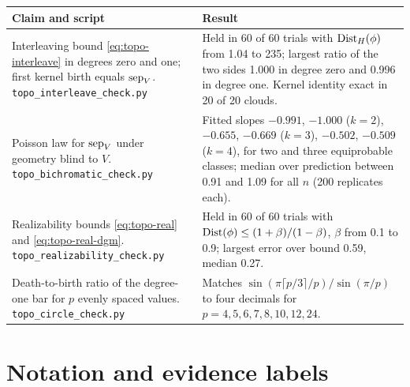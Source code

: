 \documentclass[11pt,a4paper]{article}
\begin{document}
\begin{center}\small
\begin{tabular}{@{}P{5.9cm}P{9.6cm}@{}}
\toprule
Claim and script & Result \\
\midrule
Interleaving bound \eqref{eq:topo-interleave} in degrees zero and one; first
kernel birth equals $\operatorname{sep}_V$. \newline\texttt{topo\_interleave\_check.py}
& Held in 60 of 60 trials with $\operatorname{Dist}_H(\phi)$ from 1.04 to 235; largest ratio
of the two sides 1.000 in degree zero and 0.996 in degree one. Kernel identity
exact in 20 of 20 clouds. \\ \addlinespace
Poisson law for $\operatorname{sep}_V$ under geometry blind to $V$.
\newline\texttt{topo\_bichromatic\_check.py}
& Fitted slopes $-0.991$, $-1.000$ ($k=2$), $-0.655$, $-0.669$ ($k=3$),
$-0.502$, $-0.509$ ($k=4$), for two and three equiprobable classes; median
over prediction between 0.91 and 1.09 for all $n$ (200 replicates each). \\
\addlinespace
Realizability bounds \eqref{eq:topo-real} and \eqref{eq:topo-real-dgm}.
\newline\texttt{topo\_realizability\_check.py}
& Held in 60 of 60 trials with $\operatorname{Dist}(\phi)\le(1+\beta)/(1-\beta)$,
$\beta$ from 0.1 to 0.9; largest error over bound 0.59, median 0.27. \\
\addlinespace
Death-to-birth ratio of the degree-one bar for $p$ evenly spaced values.
\newline\texttt{topo\_circle\_check.py}
& Matches $\sin(\pi\lceil p/3\rceil/p)/\sin(\pi/p)$ to four decimals for
$p=4,5,6,7,8,10,12,24$. \\
\bottomrule
\end{tabular}
\end{center}

\section{Notation and evidence labels}
\end{document}
